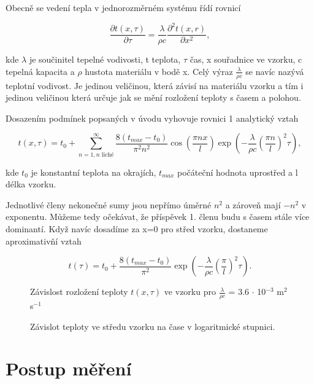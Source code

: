 \documentclass[a4paper,11pt]{article}
\begin{document}
Obecně se vedení tepla v jednorozměrném systému řídí rovnicí

\begin{equation}
\frac{\partial t(x, \tau)}{\partial \tau} = \frac{\lambda}{\rho c} \frac{\partial^2 t(x,r)}{\partial x^2},
\end{equation}

\noindent
kde $\lambda$ je součinitel tepelné vodivosti, t teplota,  $\tau$ čas, x souřadnice ve vzorku, c tepelná kapacita a $\rho$ hustota materiálu v bodě x. Celý výraz $\frac{\lambda}{\rho c}$ se navíc nazývá teplotní vodivost. Je jedinou veličinou, která závisí na materiálu vzorku a tím i jedinou veličinou která určuje jak se mění rozložení teploty s časem a polohou. 

Dosazením podmínek popsaných v úvodu vyhovuje rovnici 1 analytický vztah

\begin{equation}
  t(x, \tau) = t_0 + \sum_{n=1, n \text{ liché}}^{\infty} \frac{8(t_{max} - t_0)}{\pi^2 n^2}\cos(\frac{\pi n x}{l})\exp(- \frac{\lambda}{\rho c} (\frac{\pi n}{l})^2 \tau), 
\end{equation}

\noindent
kde $t_0$ je konstantní teplota na okrajích, $t_{max}$ počáteční hodnota uprostřed a l délka vzorku.

Jednotlivé členy nekonečné sumy jsou nepřímo úměrné $n^2$ a zároveň mají $-n^2$ v exponentu. Můžeme tedy očekávat, že příspěvek 1. členu budu s časem stále více dominantí. Když navíc dosadíme za x=0 pro střed vzorku, dostaneme aproximativňí vztah

\begin{equation}
  t(\tau) = t_0 + \frac{8(t_{max} - t_0)}{\pi^2}\exp(- \frac{\lambda}{\rho c} (\frac{\pi}{l})^2 \tau).
\end{equation}

\begin{figure}[htpb]
  \centering
  
  \caption{Závislost rozložení teploty $t(x, \tau)$ ve vzorku pro $\frac{\lambda}{\rho c}$ = 3.6 $\cdot$ 10$^{-3}$ m$^2$ s$^{-1}$}
\end{figure}


\begin{figure}[htpb]
  \centering
  
  \caption{Závislot teploty ve středu vzorku na čase v logaritmické stupnici.}
\end{figure}

\section{Postup měření}
\end{document}
